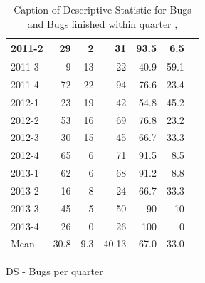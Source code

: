 \documentclass[UKenglish]{ifimaster}  %
\begin{document}
\begin{appendices}
\begin{table}[!htbp]
\begin{adjustwidth}{-3cm}{}
\begin{subfigure}[b]{0.4\textwidth}
{\begin{tabular}{ | l | r | r | r | r | r | r | }
2011-2 & 29 & 2 & 31 & 93.5 & 6.5 \\ \hline
2011-3 & 9 & 13 & 22 & 40.9 & 59.1 \\ \hline
2011-4 & 72 & 22 & 94 & 76.6& 23.4 \\ \hline
2012-1 & 23 & 19 & 42 & 54.8 & 45.2 \\ \hline
2012-2 & 53 & 16 & 69 & 76.8 & 23.2 \\ \hline
2012-3 & 30 & 15 & 45 & 66.7 & 33.3\\ \hline
2012-4 & 65 & 6 & 71 & 91.5 & 8.5 \\ \hline
2013-1 & 62 & 6 & 68 & 91.2 & 8.8 \\ \hline
2013-2 & 16 & 8 & 24 & 66.7 & 33.3 \\ \hline
2013-3 & 45 & 5 & 50 & 90 & 10 \\ \hline
2013-4 & 26 & 0 & 26 & 100 & 0 \\ \hline
Mean & 30.8&9.3&40.13&67.0&33.0 \\ \hline

\end{tabular}
}
\caption{DS - Bugs per quarter}
 \label{DS:FTPQ:10}
\end{subfigure}
\end{adjustwidth}
\caption[Optional caption for list of figures]{Caption of Descriptive Statistic for Bugs and Bugs finished within quarter  , }
\label{DS:10:5} %
\end{table}

\end{appendices}
 
\backmatter{}
\printbibliography
\end{document}
